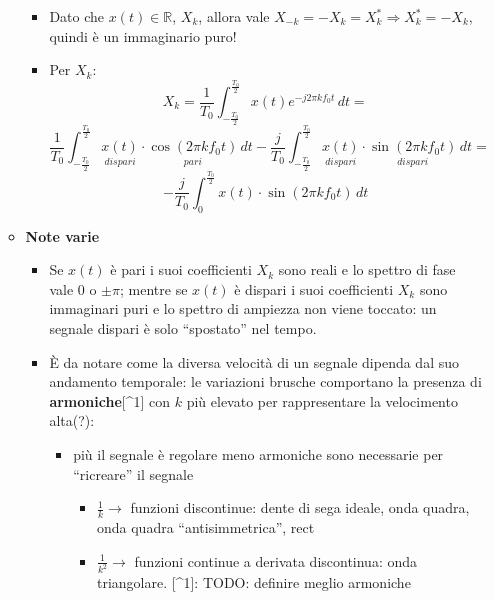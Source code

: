 \documentclass[
  paper=a4,
  ,captions=tableheading
]{scrartcl}
\providecommand{\tightlist}{%
  \setlength{\itemsep}{0pt}\setlength{\parskip}{0pt}}
\begin{document}
\begin{enumerate}
\begin{itemize}
    \begin{itemize}
    \tightlist
    \item
      Dato che \(x(t)\in\mathbb{R}\), \(X_k\), allora vale
      \(X_{-k} = -X_{k} = X_{k}^{*} \Rightarrow X_{k}^{*}=-X_k\), quindi
      è un immaginario puro!
    \item
      Per \(X_k\): \[
        X_k = \frac{1}{T_0}\int_{-\frac{T_0}{2}}^{\frac{T_0}{2}} x(t) e^{-j2\pi kf_{0}t} \,dt =
        \] \[
        \frac{1}{T_0}\int_{-\frac{T_0}{2}}^{\frac{T_0}{2}} \underset{dispari}{x(t)}\cdot\underset{pari}{\cos{(2\pi kf_{0}t)}} \,dt - \frac{j}{T_0}\int_{-\frac{T_0}{2}}^{\frac{T_0}{2}} \underset{dispari}{x(t)}\cdot\underset{dispari}{\sin{(2\pi kf_{0}t)}}\,dt=
        \] \[
        -\frac{j}{T_0} \int_{0}^{\frac{T_0}{2}} x(t)\cdot\sin{(2\pi kf_{0}t)} \,dt 
        \]
    \end{itemize}
  \item
    \textbf{Note varie}

    \begin{itemize}
    \tightlist
    \item
      Se \(x(t)\) è pari i suoi coefficienti \(X_k\) sono reali e lo
      spettro di fase vale \(0\) o \(\pm \pi\); mentre se \(x(t)\) è
      dispari i suoi coefficienti \(X_k\) sono immaginari puri e lo
      spettro di ampiezza non viene toccato: un segnale dispari è solo
      ``spostato'' nel tempo.
    \item
      È da notare come la diversa velocità di un segnale dipenda dal suo
      andamento temporale: le variazioni brusche comportano la presenza
      di \textbf{armoniche}{[}\^{}1{]} con \(k\) più elevato per
      rappresentare la velocimento alta(?):

      \begin{itemize}
      \tightlist
      \item
        più il segnale è regolare meno armoniche sono necessarie per
        ``ricreare'' il segnale

        \begin{itemize}
        \tightlist
        \item
          \(\frac{1}{k} \to\) funzioni discontinue: dente di sega
          ideale, onda quadra, onda quadra ``antisimmetrica'', rect
        \item
          \(\frac{1}{k^2} \to\) funzioni continue a derivata
          discontinua: onda triangolare. {[}\^{}1{]}: TODO: definire
          meglio armoniche
        \end{itemize}
      \end{itemize}
    \end{itemize}
  \end{itemize}
\end{enumerate}
\end{document}
